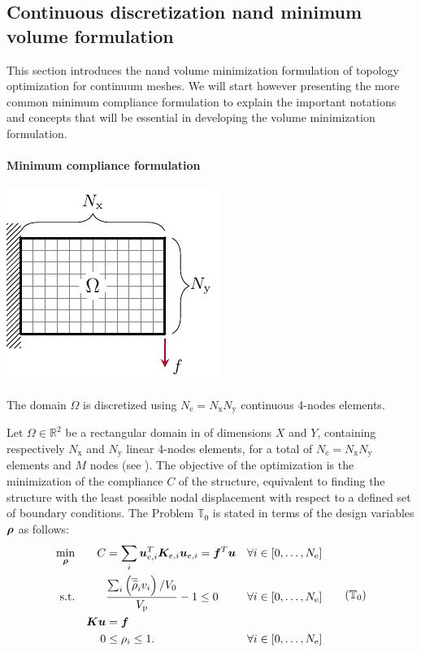 \subsection{Continuous discretization \gls{nand} minimum volume formulation}
This section introduces the \gls{nand} volume minimization formulation of topology optimization for continuum meshes. We will start however presenting the more common minimum compliance formulation to explain the important notations and concepts that will be essential in developing the volume minimization formulation.

\paragraph{Minimum compliance formulation}
\begin{marginfigure}
    \centering
    \includegraphics{figures/03_comparison_TO_TTO/01_contin_mesh/c_mesh.pdf}
    \caption{The domain $\Omega$ is discretized using $N_\text{e}=N_\text{x} N_\text{y}$ continuous 4-nodes elements.}
    \label{fig:03_mesh_c}
\end{marginfigure}
Let $\Omega \in \mathbb{R}^2$ be a rectangular domain in of dimensions $X$ and $Y$, containing respectively $N_\text{x}$ and $N_\text{y}$ linear 4-nodes elements, for a total of $N_\text{e}=N_\text{x} N_\text{y}$ elements and $M$ nodes (see ). The objective of the optimization is the minimization of the compliance $C$ of the structure, equivalent to finding the structure with the least possible nodal displacement with respect to a defined set of boundary conditions. The Problem $\mathbb{T}_0$ is stated in terms of the design variables $\bm{\rho}$ as follows:
\begin{equation}
    \begin{aligned}
    \min_{\vect{\rho}}         && C &= \sum_{i} \vect{u}_{e,i}^T \matr{K}_{e,i} \vect{u}_{e,i}=\vect{f}^T\vect{u}&& \forall i \in [0,\dots,N_\text{e}]                         \\
    \textrm{s.t.}   && & \frac{\sum_{i} \left(\rhophys_i v_i \right) / V_0}{V_\text{p}} - 1 \leq 0 && \forall i \in [0,\dots,N_\text{e}] \\
    && \matr{K}\vect{u} &= \vect{f} &&\\
    && 0 &\leq \rho_i \leq 1. && \forall i \in [0,\dots,N_\text{e}] \\
    \end{aligned}
    \tag{$\mathbb{T}_0$}
    \label{eq:03_prob-comp}
\end{equation}
